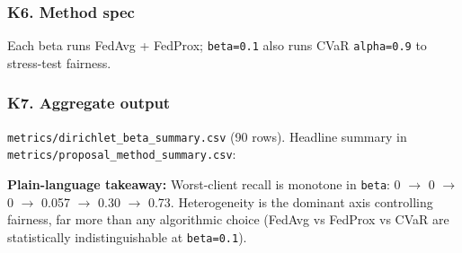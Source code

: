 \documentclass{article}
\begin{document}
\subsubsection{K6. Method spec}


Each beta runs FedAvg + FedProx; \texttt{beta=0.1} also runs CVaR \texttt{alpha=0.9} to stress-test fairness.


\subsubsection{K7. Aggregate output}


\texttt{metrics/dirichlet\_beta\_summary.csv} (90 rows). Headline summary in \texttt{metrics/proposal\_method\_summary.csv}:


\begin{table}[H]
  \centering
  \small
\end{table}


\textbf{Plain-language takeaway:} Worst-client recall is monotone in \texttt{beta}: 0 \ensuremath{\rightarrow} 0 \ensuremath{\rightarrow} 0 \ensuremath{\rightarrow} 0.057 \ensuremath{\rightarrow} 0.30 \ensuremath{\rightarrow} 0.73. Heterogeneity is the dominant axis controlling fairness, far more than any algorithmic choice (FedAvg vs FedProx vs CVaR are statistically indistinguishable at \texttt{beta=0.1}).
\end{document}
